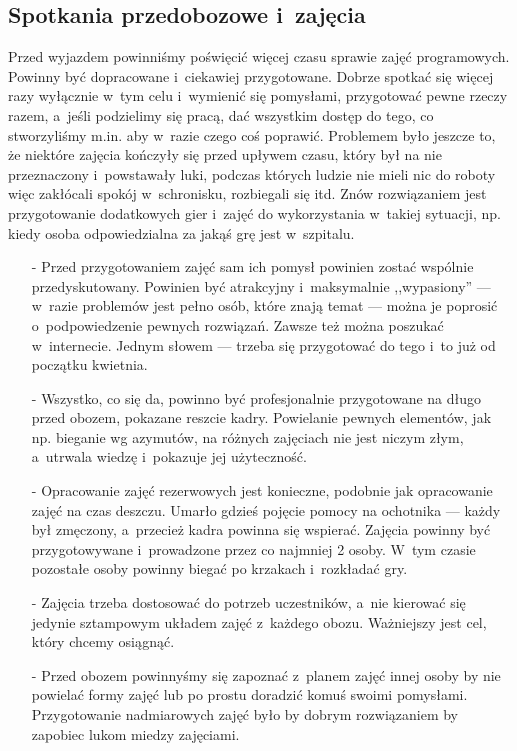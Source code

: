 \subsection{Spotkania przedobozowe i~zajęcia}
Przed wyjazdem powinniśmy poświęcić więcej czasu sprawie zajęć programowych. Powinny być dopracowane i~ciekawiej przygotowane. Dobrze spotkać się więcej razy wyłącznie w~tym celu i~wymienić się pomysłami, przygotować pewne rzeczy razem, a~jeśli podzielimy się pracą, dać wszystkim dostęp do tego, co stworzyliśmy m.in. aby w~razie czego coś poprawić. Problemem było jeszcze to, że niektóre zajęcia kończyły się przed upływem czasu, który był na nie przeznaczony i~powstawały luki, podczas których ludzie nie mieli nic do roboty więc zakłócali spokój w~schronisku, rozbiegali się itd. Znów rozwiązaniem jest przygotowanie dodatkowych gier i~zajęć do wykorzystania w~takiej sytuacji, np. kiedy osoba odpowiedzialna za jakąś grę jest w~szpitalu.
\begin{itemize}
\item[-] Przed przygotowaniem zajęć sam ich pomysł powinien zostać wspólnie przedyskutowany. Powinien być atrakcyjny i~maksymalnie ,,wypasiony'' --- w~razie problemów jest pełno osób, które znają temat --- można je poprosić o~podpowiedzenie pewnych rozwiązań. Zawsze też można poszukać w~internecie. Jednym słowem --- trzeba się przygotować do tego i~to już od początku kwietnia.
\item[-] Wszystko, co się da, powinno być profesjonalnie przygotowane na długo przed obozem, pokazane reszcie kadry. Powielanie pewnych elementów, jak np. bieganie wg azymutów, na różnych zajęciach nie jest niczym złym, a~utrwala wiedzę i~pokazuje jej użyteczność.
\item[-] Opracowanie zajęć rezerwowych jest konieczne, podobnie jak opracowanie zajęć na czas deszczu. Umarło gdzieś pojęcie pomocy na ochotnika --- każdy był zmęczony, a~przecież kadra powinna się wspierać. Zajęcia powinny być przygotowywane i~prowadzone przez co najmniej 2 osoby. W~tym czasie pozostałe osoby powinny biegać po krzakach i~rozkładać gry.
\item[-] Zajęcia trzeba dostosować do potrzeb uczestników, a~nie kierować się jedynie sztampowym układem zajęć z~każdego obozu. Ważniejszy jest cel, który chcemy osiągnąć.
\item[-] Przed obozem powinnyśmy się zapoznać z~planem zajęć innej osoby by nie powielać formy zajęć lub po prostu doradzić komuś swoimi pomysłami. Przygotowanie nadmiarowych zajęć było by dobrym rozwiązaniem by zapobiec lukom miedzy zajęciami.
\end{itemize}
